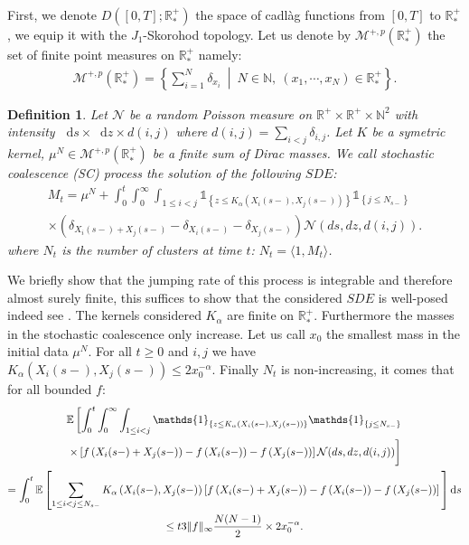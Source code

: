 \documentclass[11pt,a4paper]{article}
\newcommand{\RR}{\mathbb{R}}
\newcommand{\NN}{\mathbb{N}}
\newcommand{\RRP}{\mathbb{R}^+_*}
\newcommand{\MC}{\mathcal{M}}
\newcommand{\NC}{\mathcal{N}}
\newcommand{\SC}{{\emph{SC}}}
\newcommand{\indic}[1]{\mathds{1}_{\left\lbrace#1\right\rbrace}}
\newcommand{\dd}{\mathop{}\!\mathrm{d}}
\newtheorem{definition}[theorem]{Definition}
\begin{document}
First, we denote $D\left([0,T]; \RRP \right)$ the space of cadlàg functions from $[0,T]$ to $\RRP$, we equip it with the $J_1$-Skorohod topology. Let us denote by $\MC^{+,p}(\RRP)$ the set of finite point measures on $\RRP$ namely:
\begin{align*}
    \MC^{+,p}(\RRP) = \left\lbrace \sum\limits_{i = 1}^N \delta_{x_i}\  \middle|\  N\in \NN,\  (x_1,\cdots,x_N) \in \RRP \right\rbrace. 
\end{align*}
\begin{definition}
    Let $\NC$ be a random Poisson measure on $\RR^+ \times \RR^+ \times \NN^2$ with intensity $\dd s \times \dd z \times d(i,j)$ where $d(i,j) = \sum\limits_{i < j} \delta_{i,j}$. Let $K$ be a symetric kernel, $\mu^N \in \MC^{+,p}(\RRP)$ be a finite sum of Dirac masses. We call stochastic coalescence (\SC) process the solution of the following $SDE$:
    \begin{multline*}
        M_t = \mu^N + \int_0^t \int_0^\infty \int_{1 \leq i <j }  \indic{z \leq K_{\alpha}\left(X_{i}(s-),X_{j}(s-)\right)} \indic{j \leq N_{s-}} \\ \times \left(\delta_{X_{i}(s-) + X_{j}(s-)} - \delta_{X_{i}(s-)} - \delta_{X_{j}(s-)}\right)\mathcal{N}(ds,dz,d(i,j)).
    \end{multline*}
    where $N_t$ is the number of clusters at time $t$: $N_t = \langle 1 , M_t\rangle$.
\end{definition}
We briefly show that the jumping rate of this process is integrable and therefore almost surely finite, this suffices to show that the considered $SDE$ is well-posed indeed see \cite{applebaum2009levy}. The kernels considered $K_\alpha$ are finite on $\RRP$. Furthermore the masses in the stochastic coalescence only increase. Let us call $x_0$ the smallest mass in the initial data $\mu^N$. For all $t \geq 0$ and $i,j$ we have $K_\alpha(X_{i}(s-),X_{j}(s-)) \leq 2x_0^{-\alpha}$. Finally $N_t$ is non-increasing, it comes that for all bounded $f$:
\begin{multline*}
    \mathbb{E} \left[ \int_0^t \int_0^\infty \int_{1 \leq i <j }  \indic{z \leq K_{\alpha}\left(X_{i}(s-),X_{j}(s-)\right)} \indic{j \leq N_{s-}}\right. \\
    \left. \times   \left[f\left(X_{i}(s-) + X_{j}(s-)\right) - f\left(X_{i}(s-)\right) - f\left( X_{j}(s-)\right)\right]\mathcal{N}(ds,dz,d(i,j)) \vphantom{\int_0^t \int_0^\infty \int_{i <j } }\right] \\
    = \int_0^t \mathbb{E} \left[\sum\limits_{1 \leq i< j \leq N_{s-}} K_{\alpha}\left(X_{i}(s-),X_{j}(s-)\right) \left[f\left(X_{i}(s-) + X_{j}(s-)\right) - f\left(X_{i}(s-)\right) - f\left( X_{j}(s-)\right)\right] \vphantom{\int_0^t \int_0^\infty \int_{i <j } } \right] \dd s \\
    \leq t 3\|f\|_{\infty}\dfrac{N(N-1)}{2} \times 2 x_0^{-\alpha} .
\end{multline*}
\end{document}
